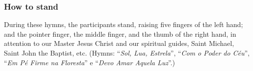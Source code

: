 {\subsubsection*{How to stand}

During these hymns, the participants stand, raising five fingers of the left
hand; and the pointer finger, the middle finger, and the thumb of the right
hand, in attention to our Master Jesus Christ and our spiritual guides, Saint
Michael, Saint John the Baptist, etc.  (Hymns: ``\textit{Sol, Lua, Estrela}'',
``\textit{Com o Poder do Céu}'', ``\textit{Em Pé Firme na Floresta}'' e
``\textit{Devo Amar Aquela Luz}''.)


\scleardpage


} %

